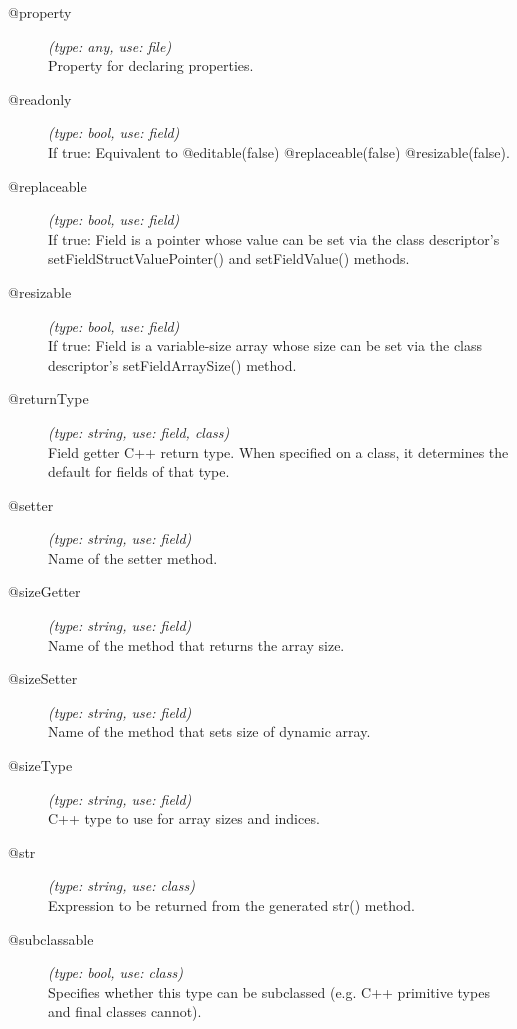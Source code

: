 \begin{description}
\item[@property] \textit{(type: any, use: file)} \\
  Property for declaring properties.

\item[@readonly] \textit{(type: bool, use: field)} \\
  If true: Equivalent to @editable(false) @replaceable(false)
  @resizable(false).

\item[@replaceable] \textit{(type: bool, use: field)} \\
  If true: Field is a pointer whose value can be set via the class
  descriptor's setFieldStructValuePointer() and setFieldValue() methods.

\item[@resizable] \textit{(type: bool, use: field)} \\
  If true: Field is a variable-size array whose size can be set via the class
  descriptor's setFieldArraySize() method.

\item[@returnType] \textit{(type: string, use: field, class)} \\
  Field getter C++ return type. When specified on a class, it determines the
  default for fields of that type.

\item[@setter] \textit{(type: string, use: field)} \\
  Name of the setter method.

\item[@sizeGetter] \textit{(type: string, use: field)} \\
  Name of the method that returns the array size.

\item[@sizeSetter] \textit{(type: string, use: field)} \\
  Name of the method that sets size of dynamic array.

\item[@sizeType] \textit{(type: string, use: field)} \\
  C++ type to use for array sizes and indices.

\item[@str] \textit{(type: string, use: class)} \\
  Expression to be returned from the generated str() method.

\item[@subclassable] \textit{(type: bool, use: class)} \\
  Specifies whether this type can be subclassed (e.g. C++ primitive types and
  final classes cannot).


\end{description}
